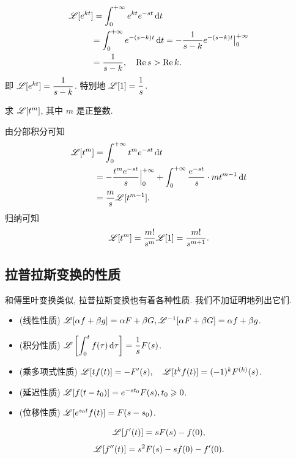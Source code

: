 \documentclass[nocolor,theme=doremi,lang=cn,11pt,chinese,twoside,openright,usesamecnt]{elegantbook}
\newenvironment{block}[1]{\begin{tcolorbox}[blockstyle,title=#1]}{\end{tcolorbox}}
\newenvironment{alertblock}[1]{\begin{tcolorbox}[alertstyle,title=#1]}{\end{tcolorbox}}
\begin{document}
\begin{solution}
	\begin{align*}
		\mathscr{L}[e^{kt}]&=\int_0^{+\infty}e^{kt}e^{-st}\,\mathrm{d} t\\
		&{=\int_0^{+\infty}e^{-(s-k)t}\,\mathrm{d} t
		=-\frac1{s-k}e^{-(s-k)t}\big|_0^{+\infty}}\\
		&{=\frac1{s-k}, \quad\operatorname{Re} s>\operatorname{Re} k.}
	\end{align*}
	即 \emph{$\mathscr{L}[e^{kt}]=\dfrac1{s-k}$}.
	特别地 \emph{$\mathscr{L}[1]=\dfrac1s$}.
\end{solution}

\begin{example}
	求 $\mathscr{L}[t^m]$, 其中 $m$ 是正整数.
\end{example}

\begin{solution}
	由分部积分可知
	\begin{align*}
		\mathscr{L}[t^m]&=\int_0^{+\infty}t^me^{-st}\,\mathrm{d} t\\
		&=-\frac{t^me^{-st}}s\Big|_0^{+\infty}+\int_0^{+\infty}\frac{e^{-st}}s\cdot mt^{m-1}\,\mathrm{d} t\\
		&=\frac ms\mathscr{L}[t^{m-1}].
	\end{align*}
	归纳可知
		\[\mathscr{L}[t^m]=\frac{m!}{s^m}\mathscr{L}[1]=\frac{m!}{s^{m+1}}.\]
\end{solution}

\subsection{拉普拉斯变换的性质}

和傅里叶变换类似, 拉普拉斯变换也有着各种性质. 我们不加证明地列出它们.

\begin{block}{拉普拉斯变换的性质}
	\begin{itemize}
		\item (线性性质) $\mathscr{L}[\alpha f+\beta g]=\alpha F+\beta G, \mathscr{L}^{-1}[\alpha F+\beta G]=\alpha f+\beta g$.
		\item (积分性质) $\displaystyle\mathscr{L}\left[\int_0^t f(\tau)\,\mathrm{d}\tau\right]=\frac 1s F(s)$.
		\item (乘多项式性质) $\mathscr{L}[tf(t)]=-F'(s),\quad\mathscr{L}[t^kf(t)]=(-1)^kF^{(k)}(s)$.
		\item (延迟性质) $\mathscr{L}[f(t-t_0)]=e^{-st_0}F(s), t_0\geqslant 0$.
		\item (位移性质) $\mathscr{L}[e^{s_0t}f(t)]=F(s-s_0)$.
	\end{itemize}
\end{block}

\begin{alertblock}{微分性质}
	\[\mathscr{L}[f'(t)]=sF(s)-f(0),\]
	\[\mathscr{L}[f''(t)]=s^2F(s)-sf(0)-f'(0).\]
\end{alertblock}
\end{document}
